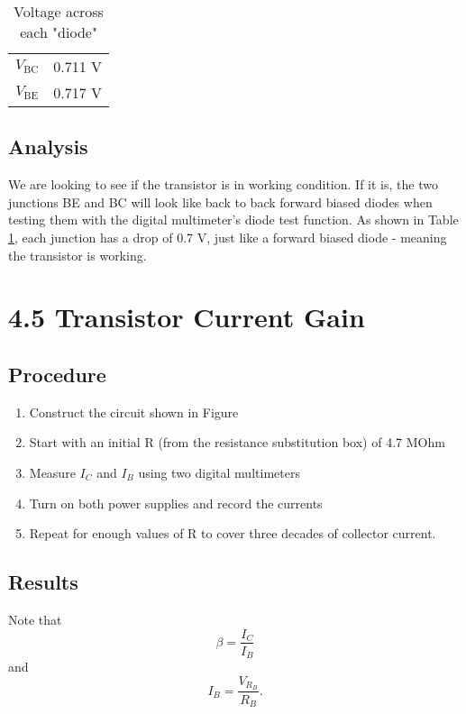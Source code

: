 \documentclass[12pt,letterpaper]{report}
\begin{document}
\begin{table}[ht]
\caption{Voltage across each "diode"} %
\centering 
    \begin{tabular}{| c | c |} 
    $V_{\text{BC}}$ & 0.711 V \\
    $V_{\text{BE}}$ & 0.717 V \\
    \end{tabular}
    \label{table:section_1}
\end{table}

\subsection*{Analysis}

We are looking to see if the transistor is in working condition. If it is, the two junctions BE and BC will look like back to back forward biased diodes when testing them with the digital multimeter's diode test function. As shown in Table \ref{table:section_1}, each junction has a drop of 0.7 V, just like a forward biased diode - meaning the transistor is working.

\section*{4.5 Transistor Current Gain}
\subsection*{Procedure}

\begin{enumerate}
\item Construct the circuit shown in Figure %
\item Start with an initial R (from the resistance substitution box) of 4.7 MOhm
\item Measure $I_C$ and $I_B$ using two digital multimeters
\item Turn on both power supplies and record the currents
\item Repeat for enough values of R to cover three decades of collector current.
\end{enumerate}

\subsection*{Results}
Note that 
$$
\beta = \frac{I_C}{I_B}
$$
and
$$
I_B = \frac{V_{R_B}}{R_B}.
$$
\end{document}
